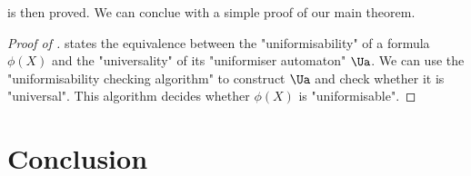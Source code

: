\documentclass[a4paper,UKenglish,cleveref, autoref, thm-restate]{lipics-v2021}
\begin{document}
 is then proved. We can conclue with a simple proof of our main theorem.

\begin{proof}[Proof of ]
	 states the equivalence between the "uniformisability" of a formula $\phi(X)$ and the "universality" of its "uniformiser automaton" $\Ua$.
	We can use the "uniformisability checking algorithm" to construct $\Ua$ and check whether it is "universal". This algorithm decides whether $\phi(X)$ is "uniformisable".
\end{proof}

\section{Conclusion}




\end{document}
